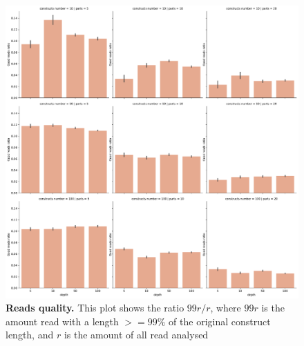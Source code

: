\documentclass[11pt, a4paper]{article}
\begin{document}
 \begin{figure}[ht]
    \begin{center}
    \includegraphics[width=1.35\textwidth]{../results/images_notebook/v_450/sim_00_good_reads_ratio.pdf}
    \end{center}
    \caption{{\bf Reads quality.}  This plot shows the ratio $99r/r$, where $99r$ is the amount read with a length $>=99\%$ of the original construct length, and $r$ is the amount of all read analysed}
   \label{fig:v_450_good_reads_ratio}
\end{figure}
\end{document}
